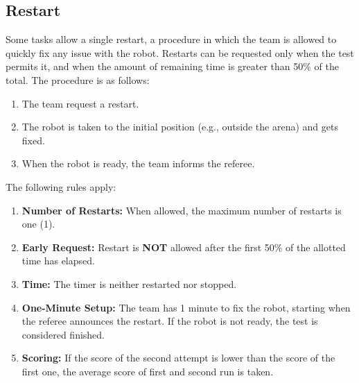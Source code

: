 \subsection{Restart}
\label{rule:restart}
Some tasks allow a single restart, a procedure in which the team is allowed to quickly fix any issue with the robot.
Restarts can be requested only when the test permits it, and when the amount of remaining time is greater than 50\% of the total.
The procedure is as follows:

\begin{enumerate}
	\item The team request a restart.
	\item The robot is taken to the initial position (e.g., outside the arena) and gets fixed.
	\item When the robot is ready, the team informs the referee.
\end{enumerate}

The following rules apply:
\begin{enumerate}
	\item \textbf{Number of Restarts:} When allowed, the maximum number of restarts is one (1).

	\item \textbf{Early Request:} Restart is \textbf{NOT} allowed after the first 50\% of the allotted time has elapsed.

	\item \textbf{Time:} The timer is neither restarted nor stopped.

	\item \textbf{One-Minute Setup:} The team has 1 minute to fix the robot, starting when the referee announces the restart.
	If the robot is not ready, the test is considered finished.

	\item \textbf{Scoring:} If the score of the second attempt is lower than the score of the first one, the average score of first and second run is taken.
\end{enumerate}

